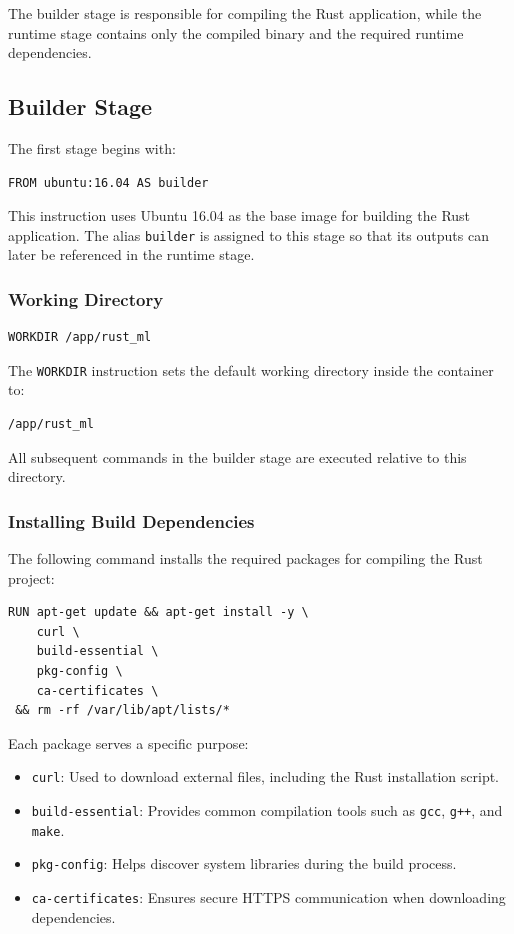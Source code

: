 \documentclass[11pt,a4paper]{article}
\begin{document}
The builder stage is responsible for compiling the Rust application, while the runtime stage contains only the compiled binary and the required runtime dependencies.

\subsection{Builder Stage}

The first stage begins with:

\begin{verbatim}
FROM ubuntu:16.04 AS builder
\end{verbatim}

This instruction uses Ubuntu 16.04 as the base image for building the Rust application. The alias \texttt{builder} is assigned to this stage so that its outputs can later be referenced in the runtime stage.

\subsubsection{Working Directory}

\begin{verbatim}
WORKDIR /app/rust_ml
\end{verbatim}

The \texttt{WORKDIR} instruction sets the default working directory inside the container to:

\begin{verbatim}
/app/rust_ml
\end{verbatim}

All subsequent commands in the builder stage are executed relative to this directory.

\subsubsection{Installing Build Dependencies}

The following command installs the required packages for compiling the Rust project:

\begin{verbatim}
RUN apt-get update && apt-get install -y \
    curl \
    build-essential \
    pkg-config \
    ca-certificates \
 && rm -rf /var/lib/apt/lists/*
\end{verbatim}

Each package serves a specific purpose:

\begin{itemize}
    \item \texttt{curl}: Used to download external files, including the Rust installation script.
    \item \texttt{build-essential}: Provides common compilation tools such as \texttt{gcc}, \texttt{g++}, and \texttt{make}.
    \item \texttt{pkg-config}: Helps discover system libraries during the build process.
    \item \texttt{ca-certificates}: Ensures secure HTTPS communication when downloading dependencies.
\end{itemize}
\end{document}
